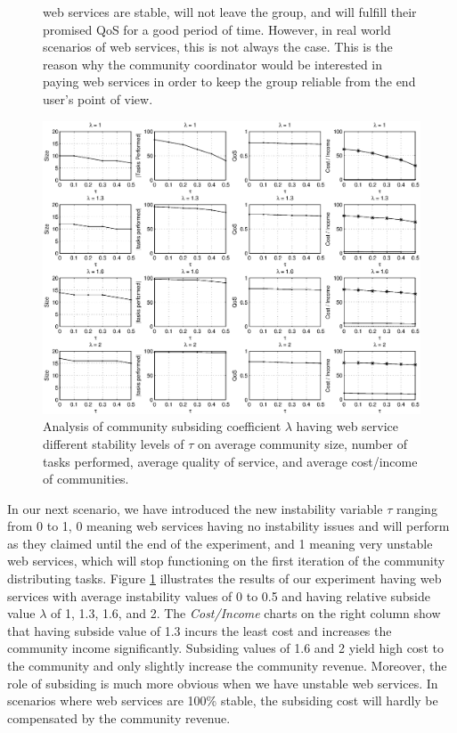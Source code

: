 \begin{figure}%
web services are stable, will not leave the group, and will
fulfill their promised QoS for a good period of time. However, in
real world scenarios of web services, this is not always the case.
This is the reason why the community coordinator would be interested in paying
web services in order to keep the group reliable from the end
user's point of view.
\centerline{\includegraphics[width=6.8in]{Figures/tax_dyn.eps}}
\caption{Analysis of community subsiding coefficient $\lambda$
having web service different stability levels of $\tau$ on average
community size, number of tasks performed, average quality of
service, and average cost/income of communities.}
\label{fig_dynamic_taxtation}
\end{figure}


In our next scenario, we have introduced the
new instability variable $\tau$ ranging from 0 to 1, 0 meaning web
services having no instability issues and will perform as they
claimed until the end of the experiment, and 1 meaning very
unstable web services, which will stop functioning on the first
iteration of the community distributing tasks. Figure
\ref{fig_dynamic_taxtation} illustrates the results of our
experiment having web services with average instability values of
0 to 0.5 and having relative subside value $\lambda$ of 1, 1.3,
1.6, and 2. The \emph{Cost/Income} charts on the right column show
that having subside value of 1.3 incurs the least cost and
increases the community income significantly. Subsiding values of
1.6 and 2 yield high cost to the community and only slightly
increase the community revenue. Moreover, the role of subsiding is
much more obvious when we have unstable web services. In scenarios
where web services are 100\% stable, the subsiding cost will
hardly be compensated by the community revenue.

